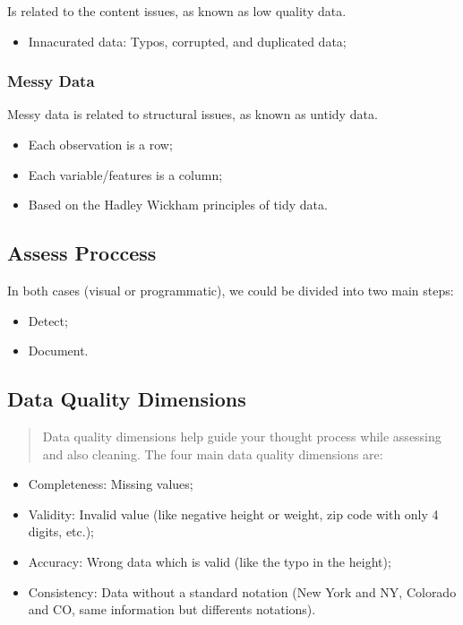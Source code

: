 \documentclass[]{book}
\providecommand{\tightlist}{%
  \setlength{\itemsep}{0pt}\setlength{\parskip}{0pt}}
\begin{document}
Is related to the content issues, as known as low quality data.

\begin{itemize}
\tightlist
\item
  Innacurated data: Typos, corrupted, and duplicated data;
\end{itemize}

\subsubsection{Messy Data}\label{messy-data}

Messy data is related to structural issues, as known as untidy data.

\begin{itemize}
\tightlist
\item
  Each observation is a row;
\item
  Each variable/features is a column;
\item
  Based on the Hadley Wickham principles of tidy data.
\end{itemize}

\subsection{Assess Proccess}\label{assess-proccess}

In both cases (visual or programmatic), we could be divided into two
main steps:

\begin{itemize}
\tightlist
\item
  Detect;
\item
  Document.
\end{itemize}

\subsection{Data Quality Dimensions}\label{data-quality-dimensions}

\begin{quote}
Data quality dimensions help guide your thought process while assessing
and also cleaning. The four main data quality dimensions are:
\end{quote}

\begin{itemize}
\tightlist
\item
  Completeness: Missing values;
\item
  Validity: Invalid value (like negative height or weight, zip code with
  only 4 digits, etc.);
\item
  Accuracy: Wrong data which is valid (like the typo in the height);
\item
  Consistency: Data without a standard notation (New York and NY,
  Colorado and CO, same information but differents notations).
\end{itemize}
\end{document}
